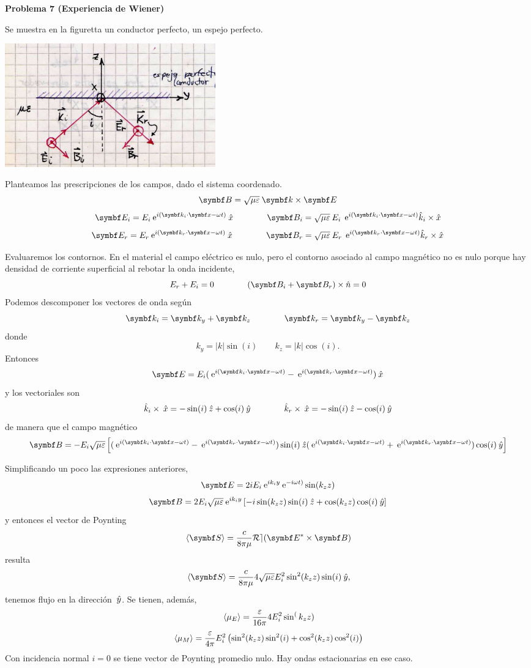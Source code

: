 \documentclass[10pt,oneside]{CBFT_book}
\begin{document}
\begin{ejemplo}{\bf Problema 7 (Experiencia de Wiener)}

Se muestra en la figuretta un conductor perfecto, un espejo perfecto.

\includegraphics[width=0.40\textwidth]{images/fig_ft1_problema7A_ondas.jpg} 

Planteamos las prescripciones de los campos, dado el sistema coordenado.
\[
	\vb{B} = \sqrt{\mu\vare} \:\pv{k}{E}
\]
\[
	\vb{E}_i = E_i \euler^{ i ( \pe{k_i}{x} - \omega t )} \xver \qquad \qquad 
	\vb{B}_i = \sqrt{\mu\vare} \: E_i \: \euler^{ i ( \pe{k_i}{x} - \omega t ) } 
	\hat{k}_i\times\hat{x}
\]
\[
	\vb{E}_r = E_r \euler^{ i ( \pe{k_r}{x} - \omega t )} \xver \qquad \qquad 
	\vb{B}_r = \sqrt{\mu\vare} \: E_r \: \euler^{ i ( \pe{k_r}{x} - \omega t ) } 
	\hat{k}_r\times\hat{x}
\]

Evaluaremos los contornos. En el material el campo eléctrico es nulo, pero el contorno
asociado al campo magnético no es nulo porque hay densidad de corriente superficial al
rebotar la onda incidente,
\[
	E_r + E_i = 0 \qquad \qquad ( \vb{B}_i + \vb{B}_r ) \times \hat{n} = 0
\]
Podemos descomponer los vectores de onda según
\[
	\vb{k}_i = \vb{k}_y + \vb{k}_z \qquad \qquad 
	\vb{k}_r = \vb{k}_y - \vb{k}_z 
\]
donde 
\[
	k_y = |k|\sin( i) \qquad k_z = |k|\cos( i) .
\]
Entonces
\[
	\vb{E} = E_i ( \euler^{ i ( \pe{k_i}{x} - \omega t)} - 
	\euler^{i ( \pe{k_r}{x} - \omega t)} ) \xver
\]
y los vectoriales son
\[
	\hat{k}_i \times \:\hat{x} = - \sin(i) \:\hat{z} + \cos(i) \:\hat{y}
	\qquad \qquad 
	\hat{k}_r \times \:\hat{x} = - \sin(i) \:\hat{z} - \cos(i) \:\hat{y}
\]
de manera que el campo magnético
\[
	\vb{B} = -E_i \sqrt{\mu\vare} 
	\left[ 
	( \euler^{ i ( \pe{k_i}{x} - \omega t)} - \euler^{i ( \pe{k_r}{x} - \omega t)} ) 
	\sin(i) \zver
	( \euler^{ i ( \pe{k_i}{x} - \omega t)} + \euler^{i ( \pe{k_r}{x} - \omega t)} ) 
	\cos(i) \yver
	\right]
\]

Simplificando un poco las expresiones anteriores,
\[
	\vb{E} = 2 i E_i \euler^{ i k_i y } \euler^{ - i \omega t)} \sin( k_z z )
\]
\[
	\vb{B} = 2 E_i \sqrt{\mu\vare} \euler^{ i k_i y } 
	\left[ 
	- i \sin( k_z z ) \sin(i ) \zver +
	\cos( k_z z ) \cos(i ) \yver
	\right]
\]
y entonces el vector de Poynting 
\[
	\vm{\vb{S}} = \frac{c}{8\pi \mu} \mathcal{Re}( \vb{E}^* \times \vb{B} )
\]
resulta
\[
	\vm{\vb{S}} = \frac{c}{8\pi \mu} 4 \sqrt{\mu\vare} E_i^2 \sin^2(k_z z )\sin(i) \yver,
\]
tenemos flujo en la dirección $\:\hat{y}$. Se tienen, además,
\[
	\:\langle \mu_E \rangle = \frac{\varepsilon}{16\pi} 4 E_i^2 \sin^(k_z z) 
\]
\[
	\:\langle \mu_M \rangle = \frac{\varepsilon}{4\pi} E_i^2 
	\left(
	\sin^2(k_zz) \sin^2(i) + \cos^2(k_zz) \cos^2(i)
	\right)
\]
Con incidencia normal $i=0$ se tiene vector de Poynting promedio nulo. Hay ondas estacionarias
en ese caso.


\end{ejemplo}
\end{document}
